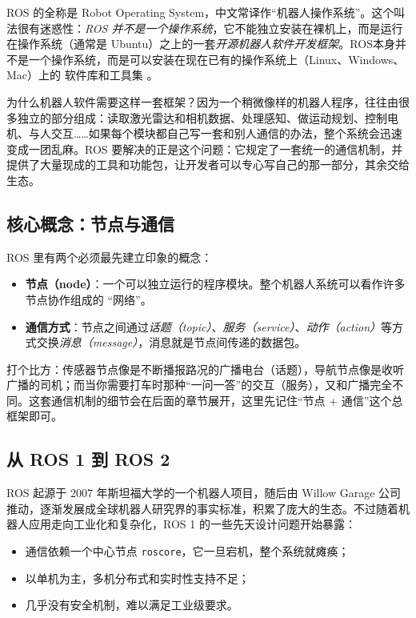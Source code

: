 \documentclass[12pt,a4paper]{ctexbook}
\begin{document}
ROS 的全称是 Robot Operating System，中文常译作``机器人操作系统''。这个叫法很有迷惑性：\emph{ROS 并不是一个操作系统}，它不能独立安装在裸机上，而是运行在操作系统（通常是 Ubuntu）之上的一套\emph{开源机器人软件开发框架}。ROS本身并不是一个操作系统，而是可以安装在现在已有的操作系统上（Linux、Windows、Mac）上的 软件库和工具集 。

为什么机器人软件需要这样一套框架？因为一个稍微像样的机器人程序，往往由很多独立的部分组成：读取激光雷达和相机数据、处理感知、做运动规划、控制电机、与人交互……如果每个模块都自己写一套和别人通信的办法，整个系统会迅速变成一团乱麻。ROS 要解决的正是这个问题：它规定了一套统一的通信机制，并提供了大量现成的工具和功能包，让开发者可以专心写自己的那一部分，其余交给生态。

\subsection{核心概念：节点与通信}

ROS 里有两个必须最先建立印象的概念：

\begin{itemize}
    \item \textbf{节点（node）}：一个可以独立运行的程序模块。整个机器人系统可以看作许多节点协作组成的 ``网络''。
    \item \textbf{通信方式}：节点之间通过\emph{话题（topic）}、\emph{服务（service）}、\emph{动作（action）}等方式交换\emph{消息（message）}，消息就是节点间传递的数据包。
\end{itemize}

打个比方：传感器节点像是不断播报路况的广播电台（话题），导航节点像是收听广播的司机；而当你需要打车时那种``一问一答''的交互（服务），又和广播完全不同。这套通信机制的细节会在后面的章节展开，这里先记住``节点 + 通信''这个总框架即可。

\subsection{从 ROS 1 到 ROS 2}

ROS 起源于 2007 年斯坦福大学的一个机器人项目，随后由 Willow Garage 公司推动，逐渐发展成全球机器人研究界的事实标准，积累了庞大的生态。不过随着机器人应用走向工业化和复杂化，ROS 1 的一些先天设计问题开始暴露：

\begin{itemize}
    \item 通信依赖一个中心节点 \texttt{roscore}，它一旦宕机，整个系统就瘫痪；
    \item 以单机为主，多机分布式和实时性支持不足；
    \item 几乎没有安全机制，难以满足工业级要求。
\end{itemize}
\end{document}

